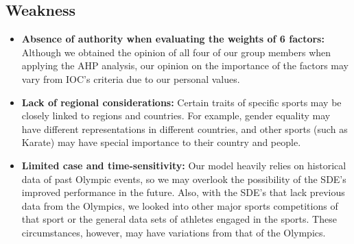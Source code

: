 \documentclass[12pt]{article}
\begin{document}
\subsection{Weakness}
\begin{itemize}
    \item \textbf{Absence of authority when evaluating the weights of 6 factors: } 
    Although we obtained the opinion of all four of our group members when applying the AHP analysis, our opinion on the importance of the factors may vary from IOC’s criteria due to our personal values. 

    \item \textbf{Lack of regional considerations: } 
    Certain traits of specific sports may be closely linked to regions and countries. For example, gender equality may have different representations in different countries, and other sports (such as Karate) may have special importance to their country and people. 

    \item \textbf{Limited case and time-sensitivity:}
    Our model heavily relies on historical data of past Olympic events, so we may overlook the possibility of the SDE’s improved performance in the future. Also, with the SDE’s that lack previous data from the Olympics, we looked into other major sports competitions of that sport or the general data sets of athletes engaged in the sports. These circumstances, however, may have variations from that of the Olympics.  

\end{itemize}

\end{document}
